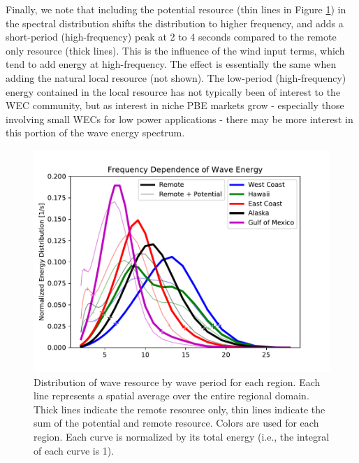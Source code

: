 Finally, we note that including the potential resource (thin lines in Figure \ref{fig:remote-freq}) in the spectral distribution shifts the distribution to higher frequency, and adds a short-period (high-frequency) peak at 2 to 4 seconds compared to the remote only resource (thick lines). This is the influence of the wind input terms, which tend to add energy at high-frequency. The effect is essentially the same when adding the natural local resource (not shown). The low-period (high-frequency) energy contained in the local resource has not typically been of interest to the WEC community, but as interest in niche PBE markets grow - especially those involving small WECs for low power applications - there may be more interest in this portion of the wave energy spectrum.

\begin{figure}[ht]
  \centering
  \includegraphics[width=\linewidth]{../fig/TotalResource_Freq02.pdf}
  \caption[Distribution of wave energy vs. wave-period.]{Distribution of wave resource by wave period for each region. Each line represents a spatial average over the entire regional domain. Thick lines indicate the remote resource only, thin lines indicate the sum of the potential and remote resource. Colors are used for each region. Each curve is normalized by its total energy (i.e., the integral of each curve is 1).}
  \label{fig:remote-freq}
\end{figure}

